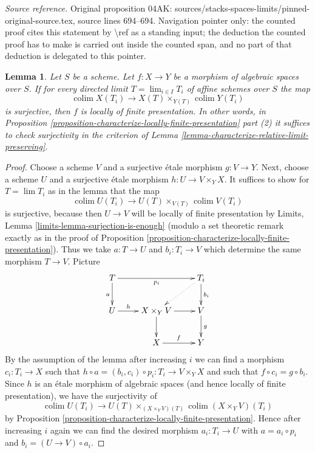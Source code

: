 \documentclass{stacks-project}
\theoremstyle{plain}
\newtheorem{lemma}[subsection]{Lemma}
\theoremstyle{definition}
\theoremstyle{remark}
\numberwithin{equation}{subsection}
\def\lim{\mathop{\mathrm{lim}}\nolimits}
\def\colim{\mathop{\mathrm{colim}}\nolimits}
\begin{document}
\noindent\textit{Source reference.} Original proposition 04AK: sources/stacks-spaces-limits/pinned-original-source.tex, source lines 694--694. Navigation pointer only: the counted proof cites this statement by \textbackslash{}ref as a standing input; the deduction the counted proof has to make is carried out inside the counted span, and no part of that deduction is delegated to this pointer.\par\medskip
\begin{lemma}
\label{lemma-surjection-is-enough}
Let $S$ be a scheme.
Let $f : X \to Y$ be a morphism of algebraic spaces over $S$.
If for every directed limit $T = \lim_{i \in I} T_i$
of affine schemes over $S$ the map
$$
\colim X(T_i) \longrightarrow X(T) \times_{Y(T)} \colim Y(T_i)
$$
is surjective, then $f$ is locally of finite presentation.
In other words, in
Proposition \ref{proposition-characterize-locally-finite-presentation}
part (2) it suffices to check surjectivity in the criterion of
Lemma \ref{lemma-characterize-relative-limit-preserving}.
\end{lemma}

\begin{proof}
Choose a scheme $V$ and a surjective \'etale morphism $g : V \to Y$.
Next, choose a scheme $U$ and a surjective \'etale morphism
$h : U \to V \times_Y X$. It suffices to show for $T = \lim T_i$
as in the lemma that the map
$$
\colim U(T_i) \longrightarrow U(T) \times_{V(T)} \colim V(T_i)
$$
is surjective, because then $U \to V$ will be locally of finite
presentation by Limits, Lemma \ref{limits-lemma-surjection-is-enough}
(modulo a set theoretic remark exactly as in the proof of
Proposition \ref{proposition-characterize-locally-finite-presentation}).
Thus we take $a : T \to U$ and $b_i : T_i \to V$ which determine
the same morphism $T \to V$. Picture
$$
\xymatrix{
T \ar[d]_a \ar[rr]_{p_i} & & T_i \ar[d]^{b_i} \ar@{..>}[ld] \\
U \ar[r]^-h & X \times_Y V \ar[d] \ar[r] & V \ar[d]^g \\
& X \ar[r]^f & Y
}
$$
By the assumption of the lemma after increasing $i$
we can find a morphism $c_i : T_i \to X$ such that
$h \circ a = (b_i, c_i) \circ p_i : T_i \to V \times_Y X$
and such that $f \circ c_i = g \circ b_i$.
Since $h$ is an \'etale morphism of algebraic spaces
(and hence locally of finite presentation), we have the surjectivity of
$$
\colim U(T_i) \longrightarrow U(T) \times_{(X \times_Y V)(T)}
\colim (X \times_Y V)(T_i)
$$
by Proposition \ref{proposition-characterize-locally-finite-presentation}.
Hence after increasing $i$ again we can find the desired
morphism $a_i : T_i \to U$ with $a = a_i \circ p_i$ and
$b_i = (U \to V) \circ a_i$.
\end{proof}
\end{document}
